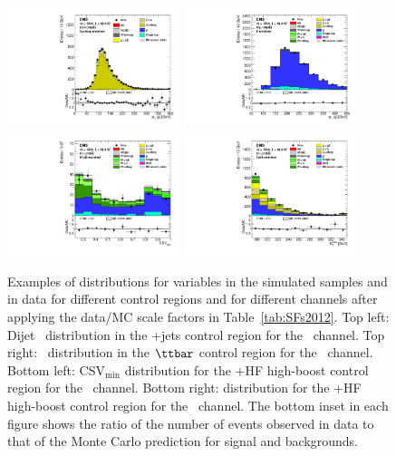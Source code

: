 \documentclass[12pt,twoside,a4paper,cmspaper,final,collab]{cms-tdr}
\begin{document}
\begin{figure}[tbh]
 \begin{center}
    \includegraphics[width=0.45\textwidth]{ZeeH_higgsCuts_Data_bbPt_Zlight_pTjj_Zee}
    \includegraphics[width=0.45\textwidth]{Wmnu-TTbar-ptjj-lin.pdf}
    \includegraphics[width=0.45\textwidth]{ZnunuHighPt_WjHF_CSVmin}
    \includegraphics[width=0.45\textwidth]{ZnunuHighPt_ZjHF_pfMET}
    \caption{Examples of distributions for variables in the simulated
      samples and in data for different
      control regions and for different channels after applying the
      data/MC scale factors in Table~\ref{tab:SFs2012}. Top left:
      Dijet \pt\ distribution in the
      \cPZ+jets control region for the \ZeeH\ channel. Top
        right: \pt\ distribution in the  $\ttbar$ control region for
      the \WmnH\ channel. Bottom left:  CSV$_{\text{min}}$
      distribution for the \PW+HF high-boost control region for the \ZnnH\
      channel. Bottom right: \MET distribution for the \cPZ+HF
      high-boost control region for the \ZnnH\ channel. The bottom inset in each
      figure shows the ratio of the number of events observed in data to that
      of the Monte Carlo prediction for signal and backgrounds.
    }
    \label{fig:control_regions_ex}
  \end{center}
\end{figure}
\end{document}
